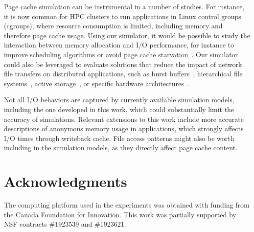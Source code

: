 \documentclass[conference]{IEEEtran}
\begin{document}
    Page cache simulation can be instrumental in a number of studies. For
    instance, it is now common for HPC clusters to run applications in
    Linux control groups (cgroups), where resource consumption is limited,
    including memory and therefore page cache usage. Using our simulator,
    it would be possible to study the interaction between memory allocation
    and I/O performance, for instance to improve scheduling algorithms or
    avoid page cache starvation~\cite{zhuang2017}. Our simulator could also
    be leveraged to evaluate solutions that reduce the impact of network
    file transfers on distributed applications, such as burst
    buffers~\cite{ferreiradasilva-fgcs-bb-2019}, hierarchical file
    systems~\cite{islam2015triple}, active storage~\cite{5496981}, or
    specific hardware architectures~\cite{hayot2020performance}. 

    Not all I/O behaviors are captured by currently available simulation models,
    including the one developed in this work, 
    which could substantially limit the accuracy of simulations.
    Relevant extensions to this work include more
    accurate descriptions of anonymous memory usage in applications, 
    which strongly affects I/O times through writeback cache. File access patterns
     might also be worth including in the simulation models,
    as they directly affect page cache content.

        \section{Acknowledgments}
The computing platform used in the experiments was obtained with funding
from the Canada Foundation for Innovation. This work was partially supported
by NSF contracts \#1923539 and \#1923621.



\end{document}
